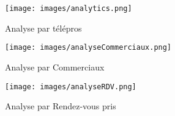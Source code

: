 \begin{figure}[H]
    \begin{minipage}[t]{0.7\textwidth}
        \centering
        \texttt{[image: images/analytics.png]}
    \end{minipage}
    \begin{minipage}[t]{0.7\textwidth}
        \caption*{Analyse par télépros}\vspace{0.3cm}
    \end{minipage}
    \vspace{1em}
    \begin{minipage}[t]{0.7\textwidth}
        \centering
        \texttt{[image: images/analyseCommerciaux.png]} %
    \end{minipage}
    \begin{minipage}[t]{0.7\textwidth}
        \caption*{Analyse par Commerciaux} \vspace{0.3cm}
    \end{minipage}
    \vspace{1em}
    \begin{minipage}[t]{0.7\textwidth}
        \centering
        \texttt{[image: images/analyseRDV.png]} %
    \end{minipage}
    \begin{minipage}[t]{0.7\textwidth}
        \caption*{Analyse par Rendez-vous pris}\vspace{0.3cm}
    \end{minipage}
\end{figure}





